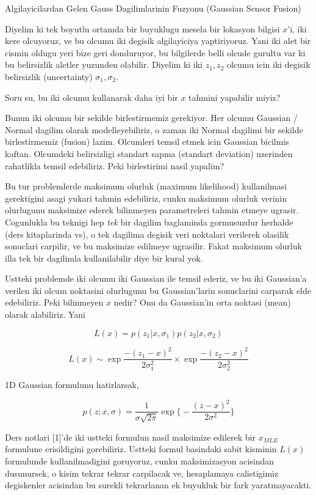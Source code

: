 \documentclass[12pt,fleqn]{article}\usepackage{../common}
\begin{document}
Algilayicilardan Gelen Gauss Dagilimlarinin Fuzyonu (Gaussian Sensor Fusion)

Diyelim ki tek boyutlu ortamda bir buyuklugu mesela bir lokasyon bilgisi
$x$'i, iki kere olcuyoruz, ve bu olcumu iki degisik algilayiciya
yaptiriyoruz. Yani iki alet bir cismin oldugu yeri bize geri donduruyor, bu
bilgilerde belli olcude gurultu var ki bu belirsizlik aletler yuzunden
olabilir. Diyelim ki iki $z_1,z_2$ olcumu icin iki degisik belirsizlik
(uncertainty) $\sigma_1,\sigma_2$. 

Soru su, bu iki olcumu kullanarak daha iyi bir $x$ tahmini yapabilir miyiz?

Bunun iki olcumu bir sekilde birlestirmemiz gerekiyor. Her olcumu Gaussian
/ Normal dagilim olarak modelleyebiliriz, o zaman iki Normal dagilimi bir
sekilde birlestirmemiz (fusion) lazim. Olcumleri temsil etmek icin Gaussian
bicilmis kaftan. Olcumdeki belirsizligi standart sapma (standart deviation)
uzerinden rahatlikla temsil edebiliriz. Peki birlestirimi nasil yapalim? 

Bu tur problemlerde maksimum olurluk (maximum likelihood) kullanilmasi
gerektigini asagi yukari tahmin edebiliriz, cunku maksimum olurluk verinin
olurlugunu maksimize ederek bilinmeyen parametreleri tahmin etmeye
ugrasir. Cogunlukla bu teknigi hep {\em tek} bir dagilim baglaminda
gormusuzdur herhalde (ders kitaplarinda vs), o tek dagilima degisik veri
noktalari verilerek olasilik sonuclari carpilir, ve bu maksimize edilmeye
ugrasilir. Fakat maksimum olurluk illa tek bir dagilimla kullanilabilir
diye bir kural yok. 

Ustteki problemde iki olcumu iki Gaussian ile temsil ederiz, ve bu iki
Gaussian'a verilen iki olcum noktasini olurlugunu bu Gaussian'larin
sonuclarini carparak elde edebiliriz. Peki bilinmeyen $x$ nedir? Onu da
Gaussian'in orta noktasi (mean) olarak alabiliriz. Yani

$$ L(x) = p(z_1|x,\sigma_1) p(z_2|x,\sigma_2) $$

$$ L(x) \sim \exp{\frac{-(z_1-x)^2}{2\sigma_1^2} } 
\times \exp \frac{-(z_2-x)^2}{2\sigma_2^2} $$

1D Gaussian formulunu hatirlarsak, 

$$ p(z;x,\sigma) = \frac{1}{\sigma\sqrt{2\pi}} 
\exp \bigg\{ - \frac{(z-x)^2}{2\sigma^2}  \bigg\}
 $$

Ders notlari [1]'de iki ustteki formulun nasil maksimize edilerek bir
$x_{MLE}$ formulune erisildigini gorebiliriz. Ustteki formul basindaki
sabit kisminin $L(x)$ formulunde kullanilmadigini goruyoruz, cunku
maksimizasyon acisindan dusunursek, o kisim tekrar tekrar carpilacak ve,
hesaplamaya calistigimiz degiskenler acisindan bu surekli tekrarlanan ek
buyukluk bir fark yaratmayacakti.
\end{document}
